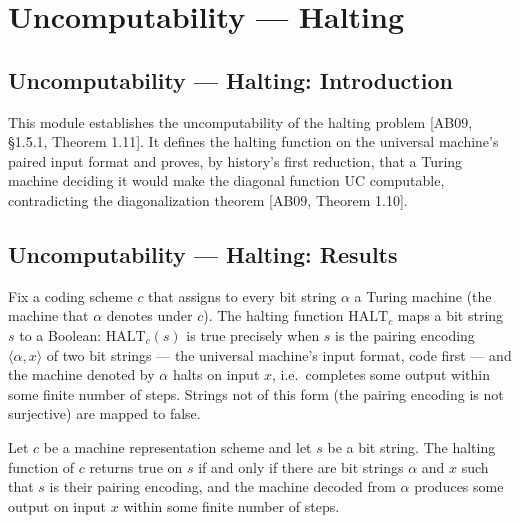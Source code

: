 \section{Uncomputability --- Halting}
\subsection*{Uncomputability --- Halting: Introduction}

This module establishes the uncomputability of the halting problem
[AB09, \S 1.5.1, Theorem 1.11]. It defines the halting function on the universal
machine's paired input format and proves, by history's first reduction, that a
Turing machine deciding it would make the diagonal function $\mathrm{UC}$
computable, contradicting the diagonalization theorem [AB09, Theorem 1.10].

\subsection*{Uncomputability --- Halting: Results}

\begin{definition}
\label{Complexity.HALT}
\leanok
{}
Fix a coding scheme $c$ that assigns to every bit string $\alpha$ a Turing machine
(the machine that $\alpha$ denotes under $c$). The halting function
$\mathrm{HALT}_c$ maps a bit string $s$ to a Boolean: $\mathrm{HALT}_c(s)$ is true
precisely when $s$ is the pairing encoding $\langle \alpha, x \rangle$ of two bit
strings --- the universal machine's input format, code first --- and the machine
denoted by $\alpha$ halts on input $x$, i.e.\ completes some output within some
finite number of steps. Strings not of this form (the pairing encoding is not
surjective) are mapped to false.
\end{definition}

\begin{theorem}
\label{Complexity.HALT_eq_true_iff}
\leanok
{}
Let $c$ be a machine representation scheme and let $s$ be a bit string. The halting
function of $c$ returns true on $s$ if and only if there are bit strings $\alpha$ and
$x$ such that $s$ is their pairing encoding, and the machine decoded from $\alpha$
produces some output on input $x$ within some finite number of steps.
\end{theorem}

